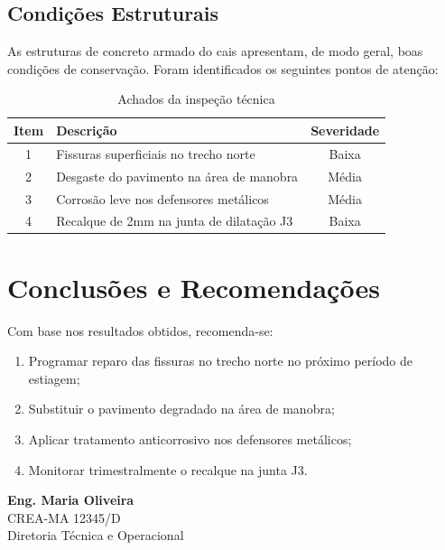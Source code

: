 \documentclass[12pt,a4paper]{article}
\begin{document}
\subsection{Condições Estruturais}

As estruturas de concreto armado do cais apresentam, de modo geral, boas condições de conservação. Foram identificados os seguintes pontos de atenção:

\begin{table}[h]
\centering
\begin{tabular}{@{}clc@{}}
  \toprule
  \textbf{Item} & \textbf{Descrição} & \textbf{Severidade} \\
  \midrule
  1 & Fissuras superficiais no trecho norte & Baixa \\
  2 & Desgaste do pavimento na área de manobra & Média \\
  3 & Corrosão leve nos defensores metálicos & Média \\
  4 & Recalque de 2mm na junta de dilatação J3 & Baixa \\
  \bottomrule
\end{tabular}
\caption{Achados da inspeção técnica}
\end{table}

\section{Conclusões e Recomendações}

Com base nos resultados obtidos, recomenda-se:

\begin{enumerate}[leftmargin=2cm]
  \item Programar reparo das fissuras no trecho norte no próximo período de estiagem;
  \item Substituir o pavimento degradado na área de manobra;
  \item Aplicar tratamento anticorrosivo nos defensores metálicos;
  \item Monitorar trimestralmente o recalque na junta J3.
\end{enumerate}

\vspace{1.5cm}

\begin{center}
\textbf{Eng. Maria Oliveira}\\
CREA-MA 12345/D\\
Diretoria Técnica e Operacional
\end{center}
\end{document}
